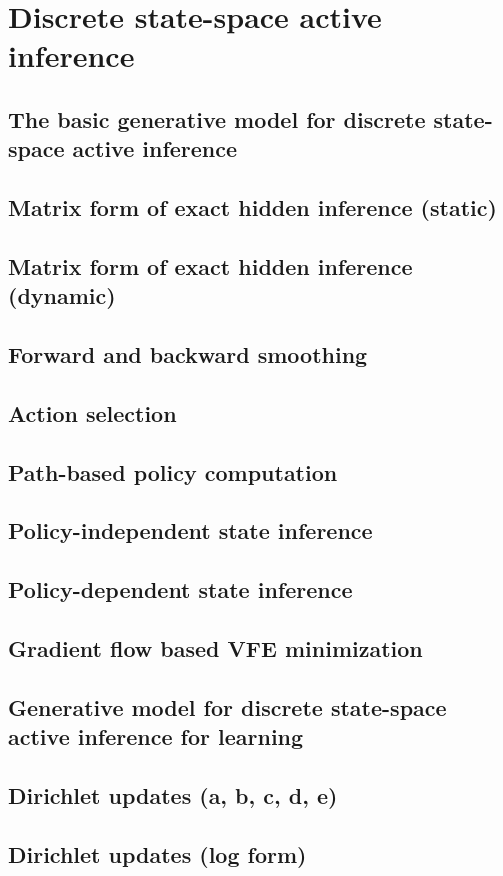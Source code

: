 \chapter{Discrete state-space active inference}

\section{The basic generative model for discrete state-space active inference}
\section{Matrix form of exact hidden inference (static)}
\section{Matrix form of exact hidden inference (dynamic)}
\section{Forward and backward smoothing}
\section{Action selection}
\section{Path-based policy computation}
\section{Policy-independent state inference}
\section{Policy-dependent state inference}
\section{Gradient flow based VFE minimization}
\section{Generative model for discrete state-space active inference for learning}
\section{Dirichlet updates (a, b, c, d, e)}
\section{Dirichlet updates (log form)}
